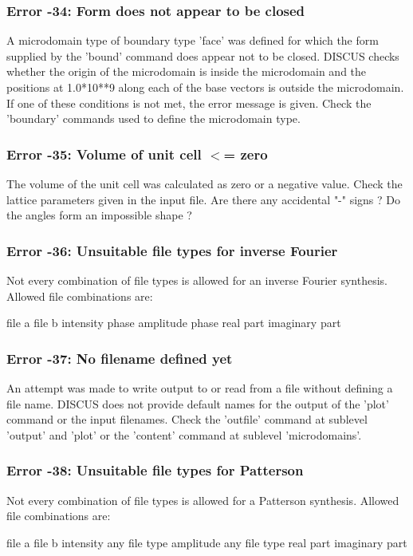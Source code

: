 \subsubsection{Error -34: Form does not appear to be closed}
\par
A microdomain type of boundary type 'face' was defined for which 
the form supplied by the 'bound' command does appear not to be closed. 
DISCUS checks whether the origin of the microdomain is inside the 
microdomain and the positions at 1.0*10**9 along each of the base 
vectors is outside the microdomain. If one of these conditions is 
not met, the error message is given. Check the 'boundary' commands 
used to define the microdomain type. 
\subsubsection{Error -35: Volume of unit cell $ <$= zero}
\par
The volume of the unit cell was calculated as zero or a negative 
value. 
Check the lattice parameters given in the input file. Are there 
any accidental "-" signs ? Do the angles form an impossible shape ? 
\subsubsection{Error -36: Unsuitable file types for inverse Fourier}
\par
Not every combination of file types is allowed for an inverse 
Fourier synthesis. Allowed file combinations are: 
\par
\begin{MacVerbatim}
  file  a     file b
  intensity   phase
  amplitude   phase
  real part   imaginary part
\end{MacVerbatim}
\subsubsection{Error -37: No filename defined yet}
\par
An attempt was made to write output to or read from a file without 
defining a file name. DISCUS does not provide default names for the 
output of the 'plot' command or the input filenames. Check the 
'outfile' command at sublevel 'output' and 'plot' or the 'content' 
command at sublevel 'microdomains'. 
\subsubsection{Error -38: Unsuitable file types for Patterson}
\par
Not every combination of file types is allowed for a Patterson 
synthesis. Allowed file combinations are: 
\par
\begin{MacVerbatim}
  file  a     file b
  intensity   any file type
  amplitude   any file type
  real part   imaginary part
\end{MacVerbatim}
